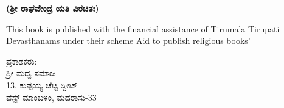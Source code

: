 \thispagestyle{empty}


\begin{center}
\textbf{(ಶ‍್ರೀ ರಾಘವೇಂದ್ರ ಯತಿ ವಿರಚಿತಃ)}
\end{center}


\begin{center}
This book is published with the financial assistance of Tirumala Tirupati Devasthanams under their scheme Aid to publish religious books'
\end{center}

\begin{center}
ಪ್ರಕಾಶಕರು: \\ ಶ‍್ರೀ ಮಧ್ವ ಸಮಾಜ \\ 13, ಕುಪ್ಪಯ್ಯ ಚೆಟ್ಟ ಸ್ವೀಟ್ \\ ವೆಸ್ಟ್ ಮಾಂಬಳಂ, ಮದರಾಸು-33
\end{center}

